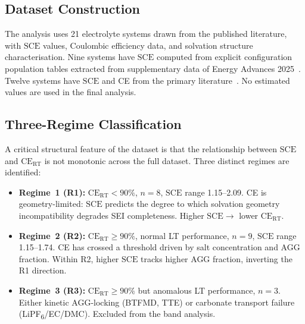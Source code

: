 \documentclass[12pt,letterpaper]{article}
\newcommand{\mSCE}{\mathrm{SCE}}
\begin{document}
\subsection{Dataset Construction}
\label{sec:data}

The analysis uses 21 electrolyte systems drawn from the
published literature, with $\mSCE$ values, Coulombic
efficiency data, and solvation structure
characterisation.
Nine systems have $\mSCE$ computed from explicit
configuration population tables extracted from
supplementary data of Energy Advances
2025~\cite{energyadvances2025}.
Twelve systems have $\mSCE$ and CE from the primary
literature~\cite{fan2023,btfmd2022,joule2025hunan,
cao2022,holoubek2022,wan2023,zhang2024,wan2023acsel,
peng2021,mdpibatt2026}.
No estimated values are used in the final analysis.

\subsection{Three-Regime Classification}
\label{sec:regimes}

A critical structural feature of the dataset is that the
relationship between $\mSCE$ and
$\mathrm{CE}_{\mathrm{RT}}$ is not monotonic across the
full dataset.
Three distinct regimes are identified:

\begin{itemize}
  \item \textbf{Regime~1 (R1):}
        $\mathrm{CE}_{\mathrm{RT}} < 90\%$,
        $n = 8$, $\mSCE$ range 1.15--2.09.
        CE is geometry-limited: $\mSCE$ predicts the
        degree to which solvation geometry incompatibility
        degrades SEI completeness.
        Higher $\mSCE \rightarrow$ lower
        $\mathrm{CE}_{\mathrm{RT}}$.

  \item \textbf{Regime~2 (R2):}
        $\mathrm{CE}_{\mathrm{RT}} \geq 90\%$,
        normal LT performance, $n = 9$,
        $\mSCE$ range 1.15--1.74.
        CE has crossed a threshold driven by salt
        concentration and AGG fraction.
        Within R2, higher $\mSCE$ tracks higher AGG
        fraction, inverting the R1 direction.

  \item \textbf{Regime~3 (R3):}
        $\mathrm{CE}_{\mathrm{RT}} \geq 90\%$
        but anomalous LT performance, $n = 3$.
        Either kinetic AGG-locking (BTFMD, TTE) or
        carbonate transport failure
        (LiPF\textsubscript{6}/EC/DMC).
        Excluded from the band analysis.
\end{itemize}
\end{document}
